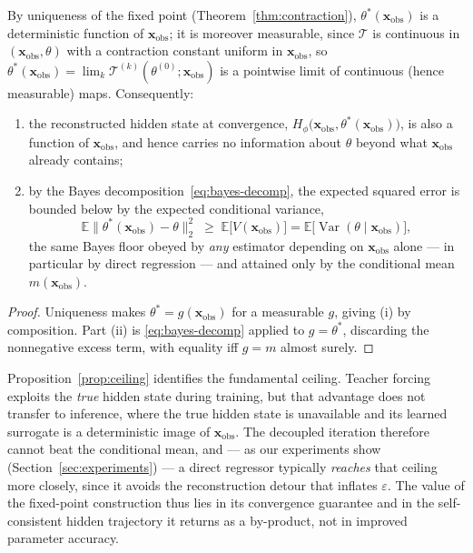 \begin{proposition}
\label{prop:ceiling}
By uniqueness of the fixed point (Theorem~\ref{thm:contraction}), $\theta^*(\mathbf{x}_\mathrm{obs})$ is a deterministic function of $\mathbf{x}_\mathrm{obs}$; it is moreover measurable, since $\mathcal{T}$ is continuous in $(\mathbf{x}_\mathrm{obs},\theta)$ with a contraction constant uniform in $\mathbf{x}_\mathrm{obs}$, so $\theta^*(\mathbf{x}_\mathrm{obs})=\lim_k \mathcal{T}^{(k)}(\theta^{(0)};\mathbf{x}_\mathrm{obs})$ is a pointwise limit of continuous (hence measurable) maps. Consequently:
\begin{enumerate}
\item[(i)] the reconstructed hidden state at convergence, $H_\phi\big(\mathbf{x}_\mathrm{obs},\theta^*(\mathbf{x}_\mathrm{obs})\big)$, is also a function of $\mathbf{x}_\mathrm{obs}$, and hence carries no information about $\theta$ beyond what $\mathbf{x}_\mathrm{obs}$ already contains;
\item[(ii)] by the Bayes decomposition~\eqref{eq:bayes-decomp}, the expected squared error is bounded below by the expected conditional variance,
\[
\mathbb{E}\big\|\theta^*(\mathbf{x}_\mathrm{obs})-\theta\big\|_2^2 \;\ge\; \mathbb{E}\big[V(\mathbf{x}_\mathrm{obs})\big]
= \mathbb{E}\big[\operatorname{Var}(\theta\mid\mathbf{x}_\mathrm{obs})\big],
\]
the same Bayes floor obeyed by \emph{any} estimator depending on $\mathbf{x}_\mathrm{obs}$ alone --- in particular by direct regression --- and attained only by the conditional mean $m(\mathbf{x}_\mathrm{obs})$.
\end{enumerate}
\end{proposition}

\begin{proof}
Uniqueness makes $\theta^*=g(\mathbf{x}_\mathrm{obs})$ for a measurable $g$, giving (i) by composition. Part (ii) is \eqref{eq:bayes-decomp} applied to $g=\theta^*$, discarding the nonnegative excess term, with equality iff $g=m$ almost surely.
\end{proof}

Proposition~\ref{prop:ceiling} identifies the fundamental ceiling. Teacher forcing exploits the \emph{true} hidden state during training, but that advantage does not transfer to inference, where the true hidden state is unavailable and its learned surrogate is a deterministic image of $\mathbf{x}_\mathrm{obs}$. The decoupled iteration therefore cannot beat the conditional mean, and --- as our experiments show (Section~\ref{sec:experiments}) --- a direct regressor typically \emph{reaches} that ceiling more closely, since it avoids the reconstruction detour that inflates $\varepsilon$. The value of the fixed-point construction thus lies in its convergence guarantee and in the self-consistent hidden trajectory it returns as a by-product, not in improved parameter accuracy.

